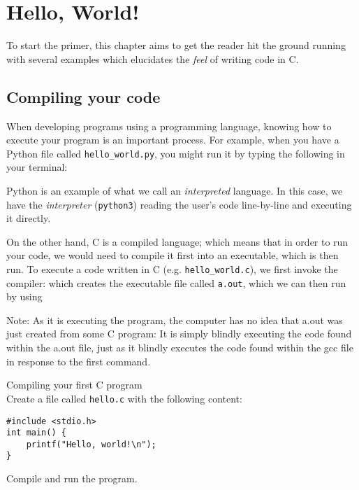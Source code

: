 \chapter{Hello, World!}

To start the primer, this chapter aims to get the reader hit the ground running with several examples which elucidates the \textit{feel} of writing code in C. 

\section{Compiling your code}

When developing programs using a programming language, knowing how to execute your program is an important process. For example, when you have a Python file called \verb|hello_world.py|, you might run it by typing the following in your terminal:

Python is an example of what we call an \textit{interpreted} language. In this case, we have the \textit{interpreter} (\verb|python3|) reading the user's code line-by-line and executing it directly.

On the other hand, C is a compiled language; which means that in order to run your code, we would need to compile it first into an executable, which is then run. To execute a code written in C (e.g. \verb|hello_world.c|), we first invoke the compiler:
which creates the executable file called \verb|a.out|, which we can then run by using

Note: As it is executing the program, the computer has no idea that a.out was just created from some C program: It is simply blindly executing the code found within the a.out file, just as it blindly executes the code found within the gcc file in response to the first command. \\ %

\begin{exercise} \label{helloworld1} 
Compiling your first C program \\
Create a file called \verb|hello.c| with the following content:
\begin{verbatim}
#include <stdio.h>
int main() {
    printf("Hello, world!\n");
}
\end{verbatim}
Compile and run the program.
\end{exercise}

